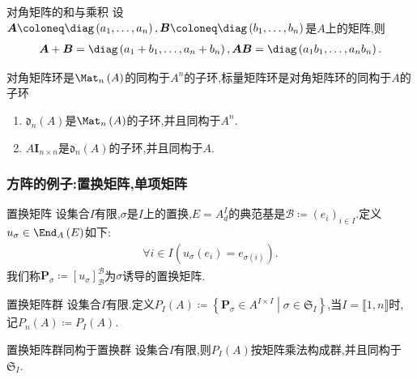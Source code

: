 \begin{corollary}{对角矩阵的和与乘积}{}
	设$\boldsymbol{A}\coloneq\diag\left(a_{1},\ldots,a_{n}\right),\boldsymbol{B}\coloneq\diag\left(b_{1},\ldots,b_{n}\right)$是$A$上的矩阵,则
	\begin{align*}
		\boldsymbol{A}+\boldsymbol{B}=\diag\left(a_{1}+b_{1},\ldots,a_{n}+b_{n}\right),\boldsymbol{A}\boldsymbol{B}=\diag\left(a_{1}b_{1},\ldots,a_{n}b_{n}\right).
	\end{align*}
\end{corollary}

\begin{proposition}{对角矩阵环是$\Mat_{n}\left(A\right)$的同构于$A^{n}$的子环,标量矩阵环是对角矩阵环的同构于$A$的子环}{}
	\begin{enumerate}
		\item $\mathfrak{d}_{n}\left(A\right)$是$\Mat_{n}\left(A\right)$的子环,并且同构于$A^{n}$.
		\item $A\boldsymbol{I}_{n\times n}$是$\mathfrak{d}_{n}\left(A\right)$的子环,并且同构于$A$.
	\end{enumerate}
\end{proposition}

\subsubsection*{方阵的例子:置换矩阵,单项矩阵}

\begin{definition}{置换矩阵}{}
	设集合$I$有限,$\sigma$是$I$上的置换,$E=A_{d}^{I}$的典范基是$\mathcal{B}\coloneq\left(e_{i}\right)_{i\in I}$.定义$u_{\sigma}\in\End_{A}\left(E\right)$如下:
	\begin{align*}
		\forall i\in I\left(u_{\sigma}\left(e_{i}\right)=e_{\sigma\left(i\right)}\right).
	\end{align*}
	我们称$\boldsymbol{P}_{\sigma}\coloneq\left[u_{\sigma}\right]_{\mathcal{B}}^{\mathcal{B}}$为$\sigma$诱导的置换矩阵.
\end{definition}

\begin{definition}{置换矩阵群}{}
	设集合$I$有限.定义$P_{I}\left(A\right)\coloneq\left\{\boldsymbol{P}_{\sigma}\in A^{I\times I}\middle|\sigma\in\mathfrak{S}_{I}\right\}$,当$I=\llbracket 1,n\rrbracket$时,记$P_{n}\left(A\right)\coloneq P_{I}\left(A\right)$.
\end{definition}

\begin{proposition}{置换矩阵群同构于置换群}{}
	设集合$I$有限,则$P_{I}\left(A\right)$按矩阵乘法构成群,并且同构于$\mathfrak{S}_{I}$.
\end{proposition}

